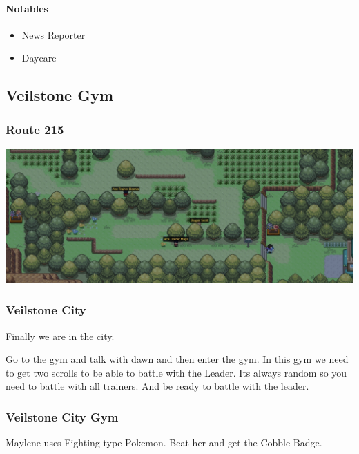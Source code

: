 \documentclass[11pt]{article}
\begin{document}
\paragraph{Notables}\label{par:notables-solaceon-town}

\begin{itemize}
    \item News Reporter
    \item Daycare
\end{itemize}

\subsection{Veilstone Gym}\label{subsec:veilstone-gym}

\subsubsection{Route 215}\label{subsubsec:route_215}

\includegraphics[width=\textwidth]{walkthrough/Sinnoh/Route_215}




\subsubsection{Veilstone City}\label{subsubsec:veilstone-city}
Finally we are in the city.

Go to the gym and talk with dawn and then enter the gym.
In this gym we need to get two scrolls to be able to battle with the Leader.
Its always random so you need to battle with all trainers.
And be ready to battle with the leader.

\subsubsection{Veilstone City Gym}\label{subsubsec:veilstone-city-gym}
Maylene uses Fighting-type Pokemon.
Beat her and get the Cobble Badge.
\end{document}
